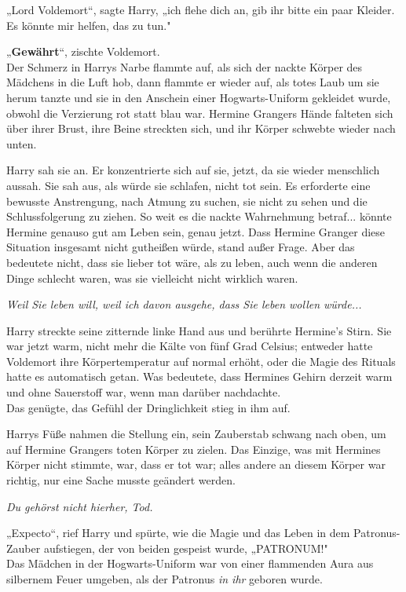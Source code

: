 {„Lord Voldemort“, sagte Harry, „ich flehe dich an, gib ihr bitte ein paar Kleider. Es könnte mir helfen, das zu tun."

„\textbf{Gewährt}“, zischte Voldemort.\\ Der Schmerz in Harrys Narbe flammte auf, als sich der nackte Körper des Mädchens in die Luft hob, dann flammte er wieder auf, als totes Laub um sie herum tanzte und sie in den Anschein einer Hogwarts-Uniform gekleidet wurde, obwohl die Verzierung rot statt blau war. Hermine Grangers Hände falteten sich über ihrer Brust, ihre Beine streckten sich, und ihr Körper schwebte wieder nach unten.

Harry sah sie an. Er konzentrierte sich auf sie, jetzt, da sie wieder menschlich aussah. Sie sah aus, als würde sie schlafen, nicht tot sein. Es erforderte eine bewusste Anstrengung, nach Atmung zu suchen, sie nicht zu sehen und die Schlussfolgerung zu ziehen. So weit es die nackte Wahrnehmung betraf... könnte Hermine genauso gut am Leben sein, genau jetzt. Dass Hermine Granger diese Situation insgesamt nicht gutheißen würde, stand außer Frage. Aber das bedeutete nicht, dass sie lieber tot wäre, als zu leben, auch wenn die anderen Dinge schlecht waren, was sie vielleicht nicht wirklich waren.

\emph{Weil Sie leben will, weil ich davon ausgehe, dass Sie leben wollen würde...}

Harry streckte seine zitternde linke Hand aus und berührte Hermine's Stirn. Sie war jetzt warm, nicht mehr die Kälte von fünf Grad Celsius; entweder hatte Voldemort ihre Körpertemperatur auf normal erhöht, oder die Magie des Rituals hatte es automatisch getan. Was bedeutete, dass Hermines Gehirn derzeit warm und ohne Sauerstoff war, wenn man darüber nachdachte.\\ Das genügte, das Gefühl der Dringlichkeit stieg in ihm auf.

Harrys Füße nahmen die Stellung ein, sein Zauberstab schwang nach oben, um auf Hermine Grangers toten Körper zu zielen. Das Einzige, was mit Hermines Körper nicht stimmte, war, dass er tot war; alles andere an diesem Körper war richtig, nur eine Sache musste geändert werden.

\emph{Du gehörst nicht hierher, Tod.}

„Expecto“, rief Harry und spürte, wie die Magie und das Leben in dem Patronus-Zauber aufstiegen, der von beiden gespeist wurde, „PATRONUM!"\\

\hfill\break Das Mädchen in der Hogwarts-Uniform war von einer flammenden Aura aus silbernem Feuer umgeben, als der Patronus \emph{in ihr} geboren wurde.

}

